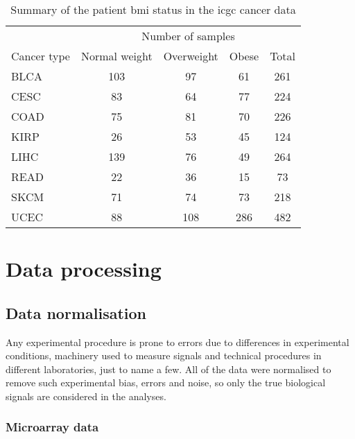 \begin{table}[p]
	\caption{Summary of the patient \gls{bmi} status in the \gls{icgc} cancer data}
	\label{tab:icgc_bmi}
	\begin{center}
		\begin{tabular}{lcccc}
			& \multicolumn{4}{c}{Number of samples}\\
			\cmidrule(r){2-5}
			Cancer type & Normal weight & Overweight & Obese & Total\\
			\hline
			\hline
			\rule{0pt}{2.25ex}BLCA & 103 & 97  & 61  & 261 \\
			CESC                   & 83  & 64  & 77  & 224 \\
			COAD                   & 75  & 81  & 70  & 226 \\
			KIRP                   & 26  & 53  & 45  & 124 \\
			LIHC                   & 139 & 76  & 49  & 264 \\
			READ                   & 22  & 36  & 15  & 73  \\
			SKCM                   & 71  & 74  & 73  & 218 \\
			UCEC                   & 88  & 108 & 286 & 482 \\
			\hline
			\hline
		\end{tabular}
	\end{center}
\end{table}

\section{Data processing}
\label{sec:datproc}

\subsection{Data normalisation}
\label{sub:data_normalisation}

Any experimental procedure is prone to errors due to differences in experimental conditions, machinery used to measure signals and technical procedures in different laboratories, just to name a few.
All of the data were normalised to remove such experimental bias, errors and noise, so only the true biological signals are considered in the analyses.

\subsubsection{Microarray data}
\label{ssub:microarray_data}

